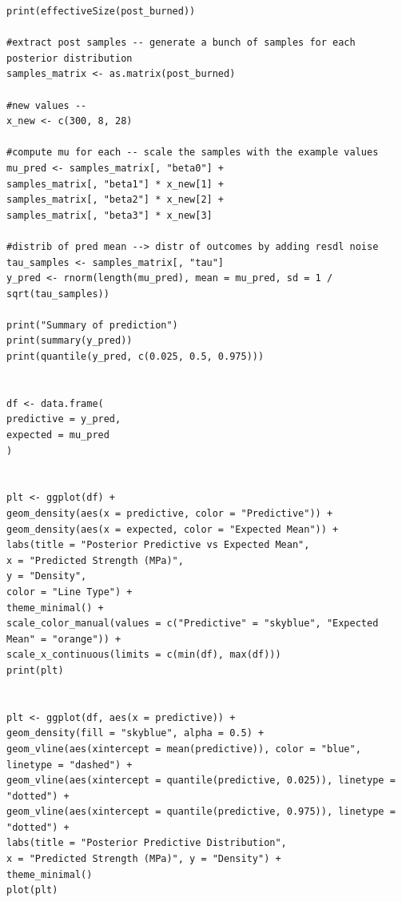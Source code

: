 \documentclass[]{article}
\begin{document}
\begin{lstlisting}
print(effectiveSize(post_burned))

#extract post samples -- generate a bunch of samples for each posterior distribution
samples_matrix <- as.matrix(post_burned)

#new values --
x_new <- c(300, 8, 28)

#compute mu for each -- scale the samples with the example values
mu_pred <- samples_matrix[, "beta0"] +
samples_matrix[, "beta1"] * x_new[1] +
samples_matrix[, "beta2"] * x_new[2] +
samples_matrix[, "beta3"] * x_new[3]

#distrib of pred mean --> distr of outcomes by adding resdl noise
tau_samples <- samples_matrix[, "tau"]
y_pred <- rnorm(length(mu_pred), mean = mu_pred, sd = 1 / sqrt(tau_samples))

print("Summary of prediction")
print(summary(y_pred))
print(quantile(y_pred, c(0.025, 0.5, 0.975)))


df <- data.frame(
predictive = y_pred,
expected = mu_pred
)


plt <- ggplot(df) +
geom_density(aes(x = predictive, color = "Predictive")) +
geom_density(aes(x = expected, color = "Expected Mean")) +
labs(title = "Posterior Predictive vs Expected Mean",
x = "Predicted Strength (MPa)",
y = "Density",
color = "Line Type") +
theme_minimal() +
scale_color_manual(values = c("Predictive" = "skyblue", "Expected Mean" = "orange")) +
scale_x_continuous(limits = c(min(df), max(df)))
print(plt)


plt <- ggplot(df, aes(x = predictive)) +
geom_density(fill = "skyblue", alpha = 0.5) +
geom_vline(aes(xintercept = mean(predictive)), color = "blue", linetype = "dashed") +
geom_vline(aes(xintercept = quantile(predictive, 0.025)), linetype = "dotted") +
geom_vline(aes(xintercept = quantile(predictive, 0.975)), linetype = "dotted") +
labs(title = "Posterior Predictive Distribution",
x = "Predicted Strength (MPa)", y = "Density") +
theme_minimal()
plot(plt)	
\end{lstlisting}
\end{document}
